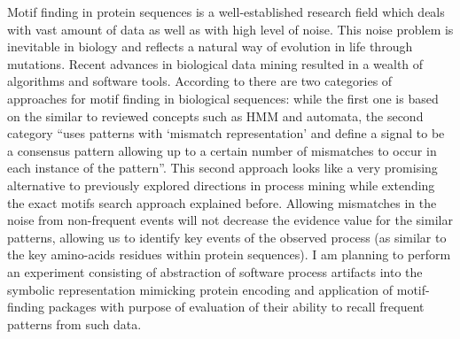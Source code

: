 \documentclass{sig-alternate}
\begin{document}
Motif finding in protein sequences is a well-established research field which deals with vast amount of data as well as with high level of noise. This noise problem is inevitable in biology and reflects a natural way of evolution in life through mutations. Recent advances in biological data mining resulted in a wealth of algorithms and software tools.  According to \cite{citeulike:964046} there are two categories of approaches for motif finding in biological sequences: while the first one is based on the similar to reviewed concepts such as HMM and automata, the second category ``uses patterns with `mismatch representation' and define a signal to be a consensus pattern allowing up to a certain number of mismatches to occur in each instance of the pattern''. This second approach looks like a very promising alternative to previously explored directions in process mining while extending the exact motifs search approach explained before. Allowing mismatches in the noise from non-frequent events will not decrease the evidence value for the similar patterns, allowing us to identify key events of the observed process (as similar to the key amino-acids residues within protein sequences). I am planning to perform an experiment consisting of abstraction of software process artifacts into the symbolic representation mimicking protein encoding and application of motif-finding packages with purpose of evaluation of their ability to recall frequent patterns from such data.
\end{document}
